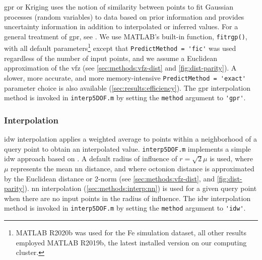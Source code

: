 \documentclass[final,twocolumn,12pt]{elsarticle}
\newcommand{\matlab}[1]{\mbox{\lstinline[style=Matlab-editor]{#1}}}
\newcommand{\inpt}{input}
\begin{document}

\Gls{gpr} or Kriging uses the notion of similarity between points to fit Gaussian processes (random variables) to data based on prior information and provides uncertainty information in addition to interpolated or inferred values. For a general treatment of \gls{gpr}, see \cite{rasmussenGaussianProcessesMachine2006}. We use MATLAB's built-in function, \matlab{fitrgp()}, with all default parameters\footnote{MATLAB R2020b was used for the Fe simulation dataset, all other results employed MATLAB R2019b, the latest installed version on our computing cluster.} except that \matlab{PredictMethod = 'fic'} was used regardless of the number of \inpt{} points, and we assume a Euclidean approximation of the \gls{vfz} (see \cref{sec:methods:vfz-dist} and \cref{fig:dist-parity}). A slower, more accurate, and more memory-intensive \matlab{PredictMethod = 'exact'} parameter choice is also available (\cref{sec:results:efficiency}). The \gls{gpr} interpolation method is invoked in \matlab{interp5DOF.m} by setting the \matlab{method} argument to \matlab{'gpr'}.

\subsubsection{ Interpolation}
\label{sec:methods:interp:idw}


\Gls{idw} interpolation applies a weighted average to points within a neighborhood of a query point to obtain an interpolated value. \matlab{interp5DOF.m} implements a simple \gls{idw} approach based on \cite{tovarInverseDistanceWeight2020}. A default radius of influence of $r=\sqrt{2} \mu$ is used, where $\mu$ represents the mean \gls{nn} distance, and where octonion distance is approximated by the Euclidean distance or 2-norm (see \cref{sec:methods:vfz-dist}, and \cref{fig:dist-parity}). \gls{nn} interpolation (\cref{sec:methods:interp:nn}) is used for a given query point when there are no \inpt{} points in the radius of influence. The \gls{idw} interpolation method is invoked in \matlab{interp5DOF.m} by setting the \matlab{method} argument to \matlab{'idw'}.
\end{document}
